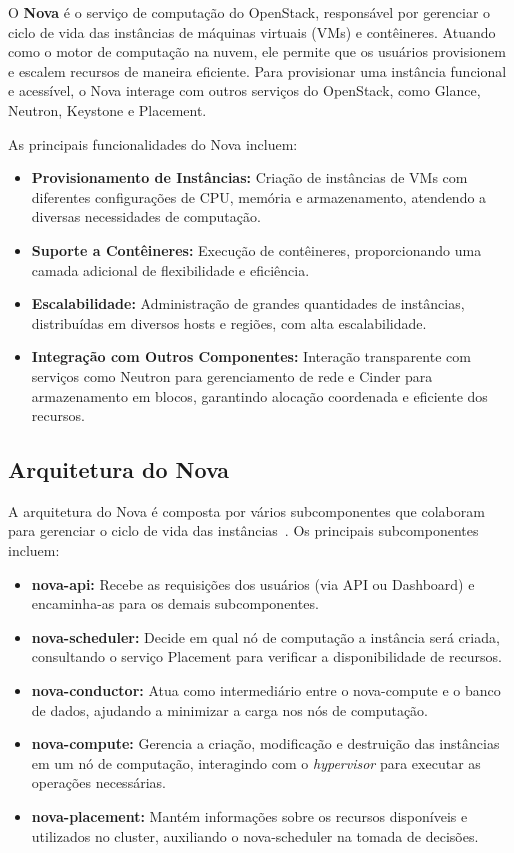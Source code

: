 O \textbf{Nova} é o serviço de computação do OpenStack, responsável por gerenciar o ciclo de vida das instâncias de máquinas virtuais (VMs) e contêineres. Atuando como o motor de computação na nuvem, ele permite que os usuários provisionem e escalem recursos de maneira eficiente. Para provisionar uma instância funcional e acessível, o Nova interage com outros serviços do OpenStack, como Glance, Neutron, Keystone e Placement.

As principais funcionalidades do Nova incluem:

\begin{itemize}
    \item \textbf{Provisionamento de Instâncias:} Criação de instâncias de VMs com diferentes configurações de CPU, memória e armazenamento, atendendo a diversas necessidades de computação.
    \item \textbf{Suporte a Contêineres:} Execução de contêineres, proporcionando uma camada adicional de flexibilidade e eficiência.
    \item \textbf{Escalabilidade:} Administração de grandes quantidades de instâncias, distribuídas em diversos hosts e regiões, com alta escalabilidade.
    \item \textbf{Integração com Outros Componentes:} Interação transparente com serviços como Neutron para gerenciamento de rede e Cinder para armazenamento em blocos, garantindo alocação coordenada e eficiente dos recursos.
\end{itemize}

\subsection{Arquitetura do Nova}

A arquitetura do Nova é composta por vários subcomponentes que colaboram para gerenciar o ciclo de vida das instâncias~\citep{OpenStackNovaArchitecture}. Os principais subcomponentes incluem:

\begin{itemize}
    \item \textbf{nova-api:} Recebe as requisições dos usuários (via API ou Dashboard) e encaminha-as para os demais subcomponentes.
    \item \textbf{nova-scheduler:} Decide em qual nó de computação a instância será criada, consultando o serviço Placement para verificar a disponibilidade de recursos.
    \item \textbf{nova-conductor:} Atua como intermediário entre o nova-compute e o banco de dados, ajudando a minimizar a carga nos nós de computação.
    \item \textbf{nova-compute:} Gerencia a criação, modificação e destruição das instâncias em um nó de computação, interagindo com o \textit{hypervisor} para executar as operações necessárias.
    \item \textbf{nova-placement:} Mantém informações sobre os recursos disponíveis e utilizados no cluster, auxiliando o nova-scheduler na tomada de decisões.
\end{itemize}


